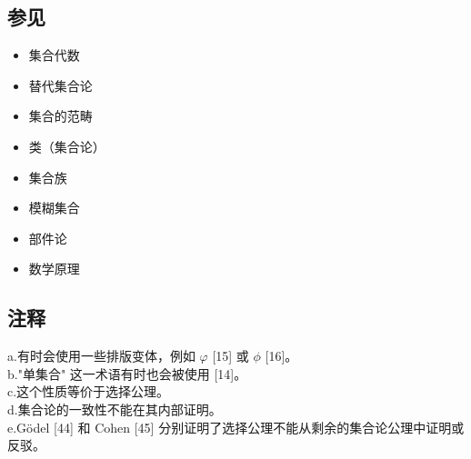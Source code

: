 \subsection{参见}
\begin{itemize}
\item 集合代数
\item 替代集合论
\item 集合的范畴
\item 类（集合论）
\item 集合族
\item 模糊集合
\item 部件论
\item 数学原理
\end{itemize}
\subsection{注释}

a.有时会使用一些排版变体，例如 \( \varphi \) [15] 或 \( \phi \) [16]。\\
b."单集合" 这一术语有时也会被使用 [14]。\\
c.这个性质等价于选择公理。\\
d.集合论的一致性不能在其内部证明。\\
e.Gödel [44] 和 Cohen [45] 分别证明了选择公理不能从剩余的集合论公理中证明或反驳。\\
